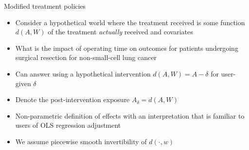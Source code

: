 \documentclass{beamer}
\begin{document}

\begin{frame}{Modified treatment policies}
    \begin{itemize}
      \item Consider a hypothetical world where the treatment received
        is some function $d(A,W)$ of the treatment \textit{actually}
        received and covariates
    \end{itemize}
    \begin{example}
      \begin{itemize}
        \item What is the impact of operating time on outcomes for patients
          undergoing surgical resection for non-small-cell lung cancer
        \item Can answer using a hypothetical intervention
          $d(A,W) = A-\delta$ for user-given $\delta$
        \item Denote the post-intervention exposure $A_\delta=d(A,W)$
        \item Non-parametric definition of effects with an interpretation
          that is familiar to users of OLS regression adjustment
        \item We assume piecewise smooth invertibility of $d(\cdot, w)$
      \end{itemize}
    \end{example}

\note{
}

\end{frame}

\end{document}
